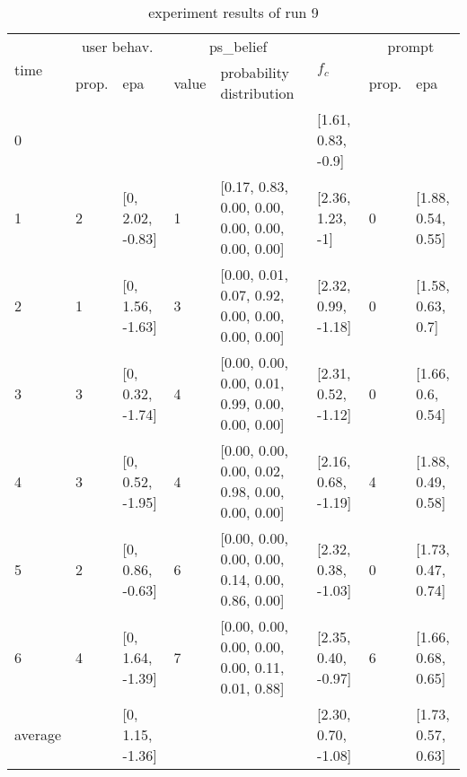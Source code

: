 \begin{table}[htbp]\footnotesize
\caption{experiment results of run 9}
\begin{tabular}{|p{0.4cm}|p{0.6cm}|l|p{0.6cm}|p{3.3cm}|l|p{0.6cm}|l|}
\hline

\multirow{2}{*}{time} & \multicolumn{2}{c|}{user behav.} & \multicolumn{2}{c|}{ps\_belief} &
\multirow{2}{*}{$f_c$} & \multicolumn{2}{c|}{prompt} \\ \cline{2-5}\cline{ 7- 8}
& prop. & epa & value & probability distribution &  & prop. & epa \\ \hline

0 & \multicolumn{1}{l|}{} &  & \multicolumn{1}{l|}{} &  & [1.61, 0.83, -0.9] & \multicolumn{1}{l|}{} &  \\ \hline
1 & 2 & [0, 2.02, -0.83] & 1 & [0.17, 0.83, 0.00, 0.00, 0.00, 0.00, 0.00, 0.00] & [2.36, 1.23, -1] & 0 & [1.88, 0.54, 0.55] \\ \hline
2 & 1 & [0, 1.56, -1.63] & 3 & [0.00, 0.01, 0.07, 0.92, 0.00, 0.00, 0.00, 0.00] & [2.32, 0.99, -1.18] & 0 & [1.58, 0.63, 0.7] \\ \hline
3 & 3 & [0, 0.32, -1.74] & 4 & [0.00, 0.00, 0.00, 0.01, 0.99, 0.00, 0.00, 0.00] & [2.31, 0.52, -1.12] & 0 & [1.66, 0.6, 0.54] \\ \hline
4 & 3 & [0, 0.52, -1.95] & 4 & [0.00, 0.00, 0.00, 0.02, 0.98, 0.00, 0.00, 0.00] & [2.16, 0.68, -1.19] & 4 & [1.88, 0.49, 0.58] \\ \hline
5 & 2 & [0, 0.86, -0.63] & 6 & [0.00, 0.00, 0.00, 0.00, 0.14, 0.00, 0.86, 0.00] & [2.32, 0.38, -1.03] & 0 & [1.73, 0.47, 0.74] \\ \hline
6 & 4 & [0, 1.64, -1.39] & 7 & [0.00, 0.00, 0.00, 0.00, 0.00, 0.11, 0.01, 0.88] & [2.35, 0.40, -0.97] & 6 & [1.66, 0.68, 0.65] \\ \hline
\multicolumn{1}{|l|}{average} & \multicolumn{1}{l|}{} & [0, 1.15, -1.36] & \multicolumn{1}{l|}{} &  & [2.30, 0.70, -1.08] & \multicolumn{1}{l|}{} & [1.73, 0.57, 0.63] \\ \hline
\end{tabular}
\label{}
\end{table}


